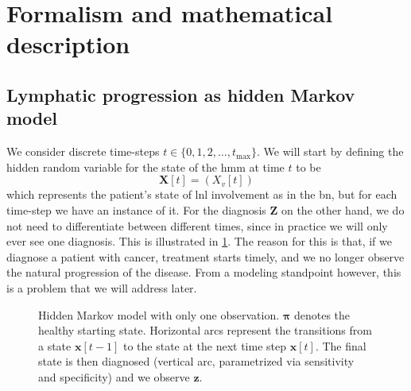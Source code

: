\documentclass[\relativeRoot/main.tex]{subfiles}
\begin{document}
\section{Formalism and mathematical description}
\label{sec:unilateral:formalism}

\subsection{Lymphatic progression as hidden Markov model}
\label{subsec:unilateral:formalism:spread_as_hmm}

We consider discrete time-steps $t \in \{ 0, 1, 2, \ldots, t_\text{max} \}$. We will start by defining the hidden random variable for the state of the \gls{hmm} at time $t$ to be
%
\begin{equation}
    \mathbf{X}[t] = \left( X_v[t] \right)
\end{equation}
%
which represents the patient's state of \gls{lnl} involvement as in the \gls{bn}, but for each time-step we have an instance of it. For the diagnosis $\mathbf{Z}$ on the other hand, we do not need to differentiate between different times, since in practice we will only ever see one diagnosis. This is illustrated in \cref{fig:unilateral:hmm_schema}. The reason for this is that, if we diagnose a patient with cancer, treatment starts timely, and we no longer observe the natural progression of the disease. From a modeling standpoint however, this is a problem that we will address later.

\begin{figure}[h]
    \centering
    \def\svgwidth{0.65\textwidth}
    
    \caption{Hidden Markov model with only one observation. $\boldsymbol{\pi}$ denotes the healthy starting state. Horizontal arcs represent the transitions from a state $\mathbf{x}[t-1]$ to the state at the next time step $\mathbf{x}[t]$. The final state is then diagnosed (vertical arc, parametrized via sensitivity and specificity) and we observe $\mathbf{z}$.}
    \label{fig:unilateral:hmm_schema}
\end{figure}
\end{document}
